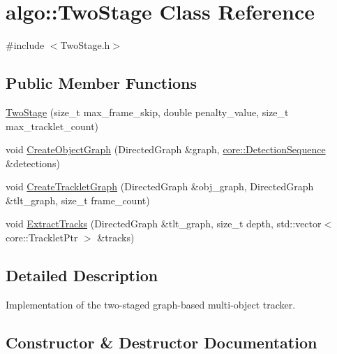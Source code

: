 \hypertarget{classalgo_1_1TwoStage}{}\section{algo\+:\+:Two\+Stage Class Reference}
\label{classalgo_1_1TwoStage}


{\ttfamily \#include $<$Two\+Stage.\+h$>$}

\subsection*{Public Member Functions}
\begin{DoxyCompactItemize}
\item 
\hyperlink{classalgo_1_1TwoStage_ae302f9ea93d56155a9dbd0be060500f7}{Two\+Stage} (size\+\_\+t max\+\_\+frame\+\_\+skip, double penalty\+\_\+value, size\+\_\+t max\+\_\+tracklet\+\_\+count)
\item 
void \hyperlink{classalgo_1_1TwoStage_aa2b03f5bc30427ec5d0a7ca703e25e11}{Create\+Object\+Graph} (Directed\+Graph \&graph, \hyperlink{classcore_1_1DetectionSequence}{core\+::\+Detection\+Sequence} \&detections)
\item 
void \hyperlink{classalgo_1_1TwoStage_ae14cf79859b4275c862d6750b6bc6837}{Create\+Tracklet\+Graph} (Directed\+Graph \&obj\+\_\+graph, Directed\+Graph \&tlt\+\_\+graph, size\+\_\+t frame\+\_\+count)
\item 
void \hyperlink{classalgo_1_1TwoStage_a09168d0ace15d689c9d594ca16b93c38}{Extract\+Tracks} (Directed\+Graph \&tlt\+\_\+graph, size\+\_\+t depth, std\+::vector$<$ core\+::\+Tracklet\+Ptr $>$ \&tracks)
\end{DoxyCompactItemize}


\subsection{Detailed Description}
Implementation of the two-\/staged graph-\/based multi-\/object tracker. 

\subsection{Constructor \& Destructor Documentation}
